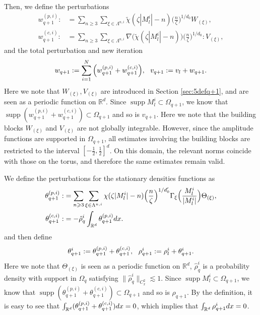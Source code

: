 \documentclass[10pt,a4paper]{amsart}
\numberwithin{equation}{section}
\DeclareMathOperator{\supp}{supp}
\def\({{\Big(}}
\def\){{\Big)}}
\def\dif{{\mathord{{\rm d}}}}
\def\mR{{\mathbb R}}
\def\geq{\geqslant}
\def\({{\Big(}}
\def\){{\Big)}}
\def\dif{{\mathord{{\rm d}}}}
\def\geq{\geqslant}
\begin{document}
Then, we define the perturbations
\begin{align*}
w_{q+1}^{(p,i)}:&=\sum_{n\geq3}\sum_{\xi\in\Lambda^{n,i}}\tilde{\chi}(\zeta |M^i_l|-n)\(\frac{n}{\zeta }\)^{1/d_0}W_{ (\xi)},\\
w_{q+1}^{(c,i)}:&=\sum_{n\geq3}\sum_{\xi\in\Lambda^{n,i}}\nabla\( \tilde{\chi}(\zeta |M^i_l|-n) \)\(\frac{n}{\zeta }\)^{1/{d_0}}:V_{ (\xi)},
\end{align*}
 and the total perturbation and new iteration  
\begin{align}
w_{q+1}:=\sum_{i=1}^N\(w_{q+1}^{(p,i)}+w_{q+1}^{(c,i)}\),\ \ v_{q+1}:=v_l+w_{q+1}.\notag
\end{align} 
Here we note that $W_{ (\xi)},V_{ (\xi)}$ are introduced in Section \ref{sec:5defq+1}, and are seen as a periodic function on $\mathbb{R}^d$.
Since $\supp M_l^i\subset\Omega_{q+1}$, we know that $\supp (w_{q+1}^{(p,i)}+w_{q+1}^{(c,i)})\subset\Omega_{q+1}$ and so is $v_{q+1}$. Here we note that the building blocks $W_{(\xi)}$ and $V_{(\xi)}$ are not globally integrable. However, since the amplitude functions are supported in $\Omega_{q+1}$, all estimates involving the building blocks are restricted to the interval $[-\frac12,\frac12]^d$. On this domain, the relevant norms coincide with those on the torus, and therefore the same estimates remain valid. 




 
We define the perturbations for the stationary  densities functions as
\begin{align}
\theta_{q+1}^{(p,i)}:&=
\sum_{n\geq3}\sum_{\xi\in\Lambda^{n,i}}\chi(\zeta |M^i_l|-n)\(\frac{n}{\zeta }\)^{1/{d_0'}}\Gamma_{\xi}\(\frac{M^i_l}{|M^i_l|}\)\Theta_{ (\xi)},\notag\\
\theta_{q+1}^{(c,i)}:&=-\hat{\rho}^i_q\int_{\mathbb{R}^d} \theta_{q+1}^{(p,i)}\dif x.\notag
\end{align}
 and then define
\begin{align}
\theta _{q+1}^i:=\theta_{q+1}^{(p,i)}+\theta_{q+1}^{(c,i)},
\ \ 
  \rho^i_{q+1}:=  \rho^i_l+\theta^i _{q+1}.\notag
\end{align} 
Here we note that $\Theta_{ (\xi)}$ is seen as a periodic function on $\mathbb{R}^d$, $ \hat{\rho}^i_q$ is a probability density with support in $\Omega_{q}$ satisfying $\|\hat{\rho}^i_q\|_{C_{x}^2}\lesssim1.$    
Since $\supp M_l^i\subset\Omega_{q+1}$, we know that $\supp (\theta_{q+1}^{(p,i)}+\theta_{q+1}^{(c,i)})\subset\Omega_{q+1}$ and so is $\rho_{q+1}$. 
 By the definition, it is easy to see that $\int_{\mR^d}(\theta_{q+1}^{(p,i)}+\theta_{q+1}^{(c,i)})\dif x=0$, which implies that $\int_{\mR^d}\rho^{i}_{q+1}\dif x=0$.
\end{document}
